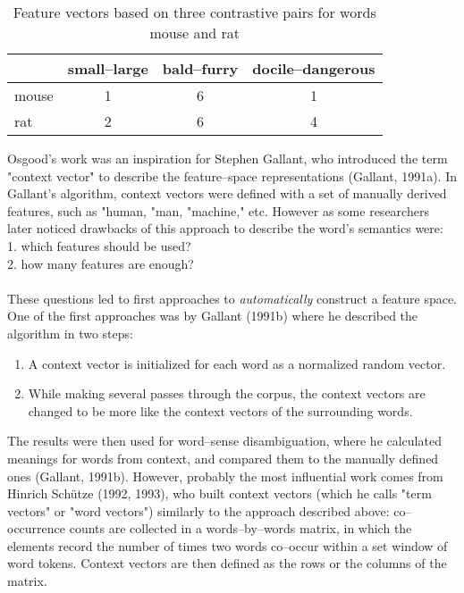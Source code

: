 \begin{table}[h!]
\begin{center}
\begin{tabular}{ l | c c c  }
   &  small--large & bald--furry& docile--dangerous\\
  \hline                       
  mouse & 1 & 6 & 1\\
  rat & 2 & 6 & 4 \\
\end{tabular}
\caption{Feature vectors based on three contrastive pairs for words mouse and rat}
\end{center}
\end{table}
Osgood's work was an inspiration for Stephen Gallant, who introduced the term "context vector" to
describe the feature--space representations (Gallant, 1991a)\cite{gallant1991a}. In Gallant's algorithm, context vectors were defined with a set of manually derived features, such as "human, "man, "machine," etc. However as some researchers later noticed drawbacks of this approach to describe the word's semantics were:
\\1. which features should be used?	
\\2. how many features are enough?
\\\\  These questions led to first approaches to \textit{automatically} construct a feature space. One of the first approaches was by Gallant (1991b)\cite{gallant1991b} where he described the algorithm in two steps:
\begin{enumerate}
\item A context vector is initialized for each word as a normalized random vector.
\item While making several passes through the corpus, the context vectors are changed to be more like the context vectors of the surrounding words.
\end{enumerate}
The results were then used for word--sense disambiguation, where he calculated meanings for words from context, and compared them to the manually defined ones (Gallant, 1991b)\cite{gallant1991b}. However, probably the most influential work comes from Hinrich Sch\"utze (1992, 1993)\cite{schutze1992}\cite{schutze1993}, who built context vectors (which he calls "term vectors" or "word vectors") similarly to the approach described above: co--occurrence counts are collected in a words--by--words matrix, in which the elements record the number of times two words co--occur within a set window of word tokens. Context vectors are then defined as the rows or the columns of the matrix.

